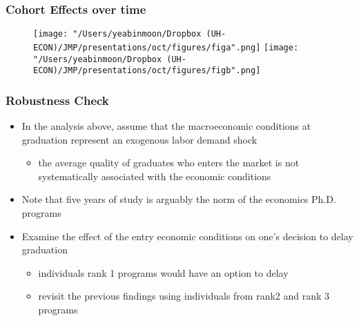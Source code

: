 \documentclass[11pt]{beamer}
\begin{document}
\begin{frame}
	\frametitle{Cohort Effects over time}
	\begin{figure}
		\centering
		\texttt{[image: "/Users/yeabinmoon/Dropbox (UH-ECON)/JMP/presentations/oct/figures/figa".png]} 
		\texttt{[image: "/Users/yeabinmoon/Dropbox (UH-ECON)/JMP/presentations/oct/figures/figb".png]} 
	\end{figure}
	
\end{frame}

\begin{frame}[label = robustness]
	\frametitle{Robustness Check}
	\begin{itemize}
	\item In the analysis above,  assume that the macroeconomic conditions at graduation represent an exogenous labor demand shock
	\begin{itemize}
		\item  the average quality of graduates who enters the market is not systematically associated with the economic conditions
		\end{itemize}
	\vspace{1 mm}
	\item Note that five years of study is arguably the norm of the economics Ph.D. programs	
	\vspace{1 mm}
	\item Examine the effect of the entry economic conditions on one's decision to delay graduation %
	\begin{itemize}
		\item individuals rank 1 programs would have an option to delay 
		\item revisit the previous findings using individuals from rank2 and rank 3 programs %
	\end{itemize}
\end{itemize}
\end{frame}
\end{document}
